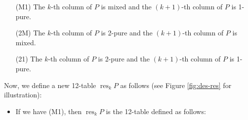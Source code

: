 \documentclass[numbers=enddot,12pt,final,onecolumn,notitlepage]{scrartcl}%
\theoremstyle{definition}
\begin{document}
\begin{itemize}
\item[(M1)] The $k$-th column of $P$ is mixed and the $\left(  k+1\right)  $-th column of $P$ is 1-pure.

\item[(2M)] The $k$-th column of $P$ is 2-pure and the $\left(  k+1\right)  $-th column of $P$ is mixed.

\item[(21)] The $k$-th column of $P$ is 2-pure and the $\left(  k+1\right)  $-th column of $P$ is 1-pure.
\end{itemize}

Now, we define a new 12-table $\operatorname*{res}\nolimits_{k}P$ as follows (see Figure \ref{fig:des-res} for illustration):

\begin{itemize}
\item If we have (M1), then $\operatorname*{res}_{k}P$ is the
12-table defined as follows:

\end{itemize}
\end{document}
